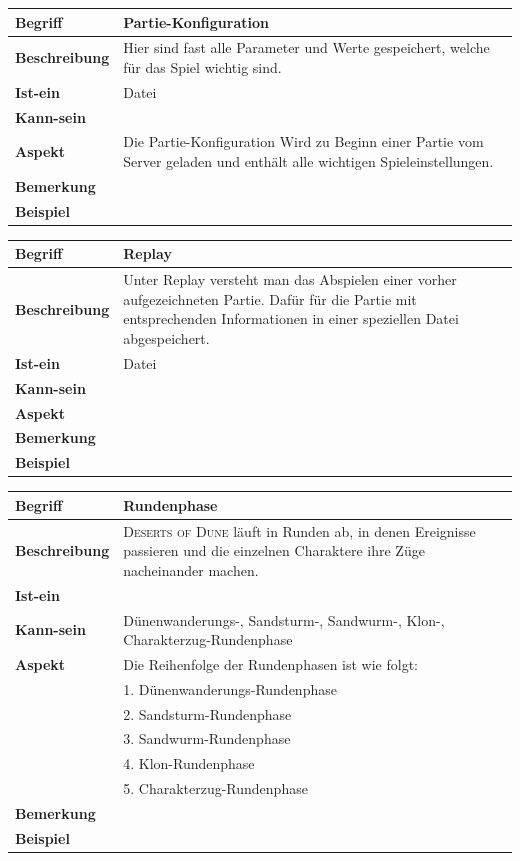 \documentclass[12pt]{article}
\newcounter{fa}
\begin{document}
\begin{tabularx}{\linewidth}{|l|X|}
\hline
\textbf{Begriff} & \textbf{Partie-Konfiguration} \\
\hline
\textbf{Beschreibung} & Hier sind fast alle Parameter und Werte gespeichert, welche für das Spiel wichtig sind. \\
\hline
\textbf{Ist-ein} & Datei \\
\hline
\textbf{Kann-sein} & \\
\hline
\textbf{Aspekt} & Die Partie-Konfiguration Wird zu Beginn einer Partie vom Server geladen und enthält alle wichtigen Spieleinstellungen.\\
\hline
\textbf{Bemerkung} &  \\
\hline
\textbf{Beispiel} &  \\
\hline
\end{tabularx}

\begin{tabularx}{\linewidth}{|l|X|}
\hline
\textbf{Begriff} & \textbf{Replay} \\
\hline
\textbf{Beschreibung} & Unter Replay versteht man das Abspielen einer vorher aufgezeichneten Partie. Dafür für die Partie mit entsprechenden Informationen in einer speziellen Datei abgespeichert. \\
\hline
\textbf{Ist-ein} & Datei \\
\hline
\textbf{Kann-sein} & \\
\hline
\textbf{Aspekt} & \\
\hline
\textbf{Bemerkung} & \\
\hline
\textbf{Beispiel} & \\
\hline
\end{tabularx}

\begin{tabularx}{\linewidth}{|l|X|}
\hline
\textbf{Begriff} & \textbf{Rundenphase} \\
\hline
\textbf{Beschreibung} & \textsc{Deserts of Dune} läuft in Runden ab, in denen Ereignisse passieren und die einzelnen Charaktere ihre Züge nacheinander machen. \\
\hline
\textbf{Ist-ein} & \\
\hline
\textbf{Kann-sein} & Dünenwanderungs-, Sandsturm-, Sandwurm-, Klon-, Charakterzug-Rundenphase\\
\hline
\textbf{Aspekt} & Die Reihenfolge der Rundenphasen ist wie folgt:\\
& 1. Dünenwanderungs-Rundenphase\\
& 2. Sandsturm-Rundenphase\\
& 3. Sandwurm-Rundenphase\\
& 4. Klon-Rundenphase\\
& 5. Charakterzug-Rundenphase\\
\hline
\textbf{Bemerkung} &  \\
\hline
\textbf{Beispiel} &  \\
\hline
\end{tabularx}
\end{document}
